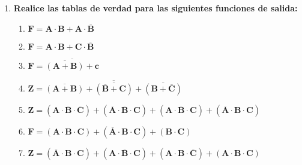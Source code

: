 \documentclass[12pt]{article}
\begin{document}
\begin{enumerate}[label = \textbf{\alph*.}]
\begin{enumerate}[label = \textbf{\arabic*.}]
                \end{enumerate}

            \newpage
            \item \textbf{Realice las tablas de verdad para las siguientes funciones de salida:}
                \begin{enumerate}[label = \textbf{\arabic*.}]
                    \item $\mathbf{F = A \cdot B + A \cdot \overline{B}}$
                    
                    \item $\mathbf{F = A \cdot B + C \cdot \overline{B}}$
                    
                    \item $\mathbf{F = \overline{\overline{(A + B)} + c}}$
                    
                    \item $\mathbf{Z = \overline{\overline{(A + B)} + \overline{(\overline{B} + C)} + \overline{(B + \overline{C})}}}$
                    
                    \item $\mathbf{Z = (A \cdot \overline{B} \cdot \overline{C}) + (\overline{A} \cdot \overline{B} \cdot C) + (A \cdot \overline{B} \cdot C) + (\overline{A} \cdot B \cdot C)}$
                    
                    \item $\mathbf{F = (A \cdot B \cdot C) + (\overline{A} \cdot B \cdot C) + (B \cdot C)}$
                    
                    \item $\mathbf{Z = (\overline{A} \cdot B \cdot C) + (A \cdot \overline{B} \cdot C) + (A \cdot B \cdot \overline{C}) + (A \cdot B \cdot C)}$
                \end{enumerate}

        \end{enumerate}
\end{document}
